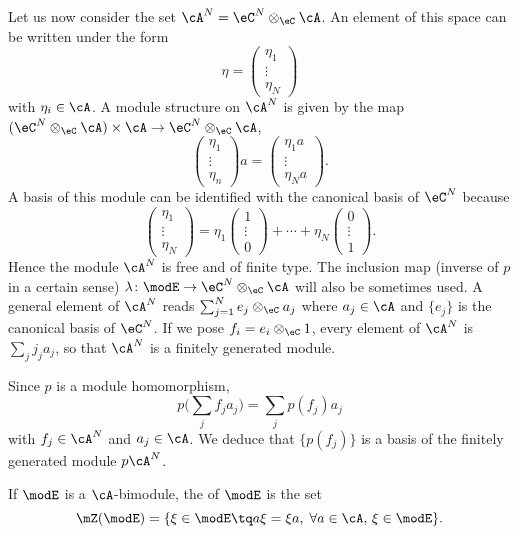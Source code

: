 Let us now consider the set $\cA^N=\eC^N\otimes_{\eC}\cA$. An element of this space can be written under the form
\[
	\eta=
	\begin{pmatrix}
		\eta_1 \\\vdots\\\eta_N
	\end{pmatrix}
\]
with $\eta_i\in\cA$. A module structure on $\cA^N$ is given by the map $(\eC^N\otimes_{\eC}\cA)\times\cA\to \eC^N\otimes_{\eC}\cA$,
\[
	\begin{pmatrix}
		\eta_1 \\\vdots\\\eta_n
	\end{pmatrix}a=
	\begin{pmatrix}
		\eta_1 a \\\vdots\\\eta_N a
	\end{pmatrix}.
\]
A basis of this module can be identified with the canonical basis of $\eC^N$ because
\[
	\begin{pmatrix}
		\eta_1 \\\vdots\\\eta_N
	\end{pmatrix}=\eta_1
	\begin{pmatrix}
		1 \\\vdots\\0
	\end{pmatrix}+\cdots+
	\eta_N\begin{pmatrix}
		0 \\\vdots\\1
	\end{pmatrix}.
\]
Hence the module $\cA^N$ is free and of finite type. The inclusion map (inverse of $p$ in a certain sense) $\lambda\colon \modE\to \eC^N\otimes_{\eC}\cA$\label{PgdeflambdaMod} will also be sometimes used. A general element of $\cA^N$ reads $\sum_{j=1}^{N}e_j\otimes_{\eC}a_j$ where $a_j\in\cA$ and $\{ e_j \}$ is the canonical basis of $\eC^N$. If we pose $f_i=e_i\otimes_{\eC}1$, every element of $\cA^{N}$ is $\sum_{j}j_ja_j$, so that $\cA^N$ is a finitely generated module.


Since $p$ is a module homomorphism,
\[
	p\big( \sum_{j}f_ja_j \big)=\sum_j p(f_j)a_j
\]
with $f_j\in\cA^N$ and $a_j\in\cA$. We deduce that $\{ p(f_j) \}$ is a basis of the finitely generated module $p\cA^N$.

If $\modE$ is a $\cA$-bimodule, the  of $\modE$ is the set
\begin{equation}
	\mZ(\modE)=\{ \xi\in\modE\tq a\xi=\xi a,\;\forall a\in\cA,\,\xi\in\modE \}.
\end{equation}

